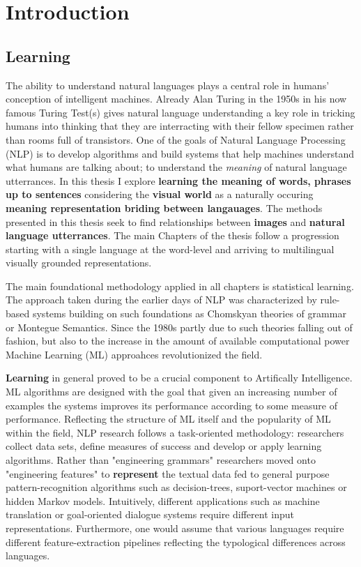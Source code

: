 
\chapter{Introduction}

\section{Learning}
The ability to understand natural languages plays a central role in humans' conception of intelligent machines.
Already Alan Turing in the 1950s in his now famous Turing Test(s) gives natural language understanding a 
key role in tricking humans into thinking that they are interracting with their fellow specimen rather 
than rooms full of transistors. One of the goals of Natural Language Processing (NLP) is to develop algorithms
and build systems that help machines understand what humans are talking about; to 
understand the \emph{meaning} of natural language utterrances. 
In this thesis I explore \textbf{learning the meaning of words, phrases up to sentences}
considering the \textbf{visual world} as a naturally occuring 
\textbf{meaning representation briding between langauages}.
The methods presented in this thesis seek to find relationships between \textbf{images} and 
\textbf{natural language utterrances}. The main Chapters of the thesis follow a progression 
starting with a single language at the word-level and arriving to multilingual visually grounded
representations.

The main foundational methodology applied in all chapters is statistical learning. 
The approach taken during the earlier days of NLP was characterized by rule-based systems building on such 
foundations as Chomskyan theories of grammar or Montegue Semantics. 
Since the 1980s partly due to such theories falling out of fashion, but also to the increase in the amount 
of available computational power Machine Learning (ML) approahces revolutionized
the field. 

\textbf{Learning} in general proved to be a crucial component to Artifically Intelligence.
ML algorithms are designed with the goal that given an increasing 
number of examples the systems improves its performance according to some measure of performance.
Reflecting the structure of ML itself and the popularity of ML within the field, NLP research follows
a task-oriented methodology: researchers collect data sets, define measures of success and develop or
apply learning algorithms.
Rather than "engineering grammars" researchers moved onto "engineering features"
to \textbf{represent} the textual data fed to general purpose pattern-recognition algorithms such as
decision-trees, suport-vector machines or hidden Markov models. 
Intuitively, different applications such as machine translation or goal-oriented dialogue systems 
require different input representations. Furthermore, one would assume that various languages require 
different feature-extraction pipelines reflecting the typological differences across languages. 

